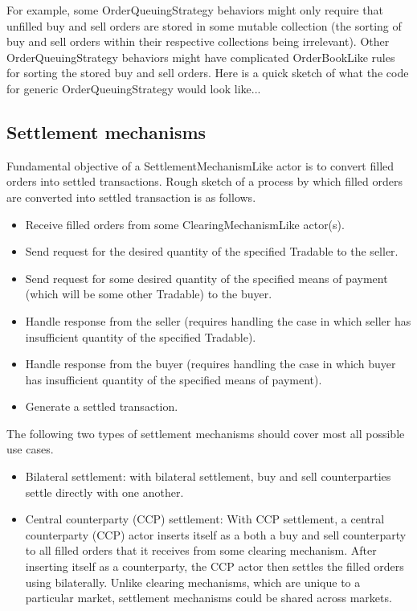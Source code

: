 \documentclass[a4paper]{article}
\begin{document}
For example, some OrderQueuingStrategy behaviors might only require that unfilled buy and sell orders are stored in some mutable collection (the sorting of buy and sell orders within their respective collections being irrelevant). Other OrderQueuingStrategy behaviors might have complicated OrderBookLike rules for sorting the stored buy and sell orders. Here is a quick sketch of what the code for generic OrderQueuingStrategy would look like...

\subsection{Settlement mechanisms} Fundamental objective of a SettlementMechanismLike actor is to convert filled orders into settled transactions. Rough sketch of a process by which filled orders are converted into settled transaction is as follows.
\begin{itemize}
    \item Receive filled orders from some ClearingMechanismLike actor(s).
    \item Send request for the desired quantity of the specified Tradable to the seller. 
    \item Send request for some desired quantity of the specified means of payment (which will be some other Tradable) to the buyer.
    \item Handle response from the seller (requires handling the case in which seller has insufficient quantity of the specified Tradable).
    \item Handle response from the buyer (requires handling the case in which buyer has insufficient quantity of the specified means of payment).
    \item Generate a settled transaction.
\end{itemize}

The following two types of settlement mechanisms should cover most all possible use cases.
\begin{itemize}
    \item Bilateral settlement: with bilateral settlement, buy and sell counterparties settle directly with one another.
    \item Central counterparty (CCP) settlement: With CCP settlement, a central counterparty (CCP) actor inserts itself as a both a buy and sell counterparty to all filled orders that it receives from some clearing mechanism. After inserting itself as a counterparty, the CCP actor then settles the filled orders using bilaterally. Unlike clearing mechanisms, which are unique to a particular market, settlement mechanisms could be shared across markets.
\end{itemize}
\end{document}
